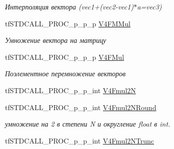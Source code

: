 \begin{DoxyCompactItemize}
\begin{DoxyCompactList}\small\item\em Интерполяция вектора (vec1+(vec2-\/vec1)$\ast$a=vec3) \end{DoxyCompactList}\item 
\hypertarget{structs_functions_vector_c_p_u_a5b46b05d03f4b8acdee8683338f74379}{tf\-S\-T\-D\-C\-A\-L\-L\-\_\-\-P\-R\-O\-C\-\_\-p\-\_\-p\-\_\-p \hyperlink{structs_functions_vector_c_p_u_a5b46b05d03f4b8acdee8683338f74379}{V4\-F\-M\-Mul}}\label{structs_functions_vector_c_p_u_a5b46b05d03f4b8acdee8683338f74379}

\begin{DoxyCompactList}\small\item\em Умножение вектора на матрицу \end{DoxyCompactList}\item 
\hypertarget{structs_functions_vector_c_p_u_affd3ee163b08ab55cba3e4eb6c693138}{tf\-S\-T\-D\-C\-A\-L\-L\-\_\-\-P\-R\-O\-C\-\_\-p\-\_\-p\-\_\-p \hyperlink{structs_functions_vector_c_p_u_affd3ee163b08ab55cba3e4eb6c693138}{V4\-F\-Mul}}\label{structs_functions_vector_c_p_u_affd3ee163b08ab55cba3e4eb6c693138}

\begin{DoxyCompactList}\small\item\em Поэлементное перемножение векторов \end{DoxyCompactList}\item 
tf\-S\-T\-D\-C\-A\-L\-L\-\_\-\-P\-R\-O\-C\-\_\-p\-\_\-p\-\_\-int \hyperlink{structs_functions_vector_c_p_u_ab4510ddff8a8787367682b61b40a9f48}{V4\-Fmul2\-N}
\item 
\hypertarget{structs_functions_vector_c_p_u_a05e600d543ba482a5f9ba5f56cf0dbc1}{tf\-S\-T\-D\-C\-A\-L\-L\-\_\-\-P\-R\-O\-C\-\_\-p\-\_\-p\-\_\-int \hyperlink{structs_functions_vector_c_p_u_a05e600d543ba482a5f9ba5f56cf0dbc1}{V4\-Fmul2\-N\-Round}}\label{structs_functions_vector_c_p_u_a05e600d543ba482a5f9ba5f56cf0dbc1}

\begin{DoxyCompactList}\small\item\em умножение на 2 в степени N и округление float в int. \end{DoxyCompactList}\item 
\hypertarget{structs_functions_vector_c_p_u_a95c366981ac48ce9780073ae5b013218}{tf\-S\-T\-D\-C\-A\-L\-L\-\_\-\-P\-R\-O\-C\-\_\-p\-\_\-p\-\_\-int \hyperlink{structs_functions_vector_c_p_u_a95c366981ac48ce9780073ae5b013218}{V4\-Fmul2\-N\-Trunc}}\label{structs_functions_vector_c_p_u_a95c366981ac48ce9780073ae5b013218}


\end{DoxyCompactItemize}
